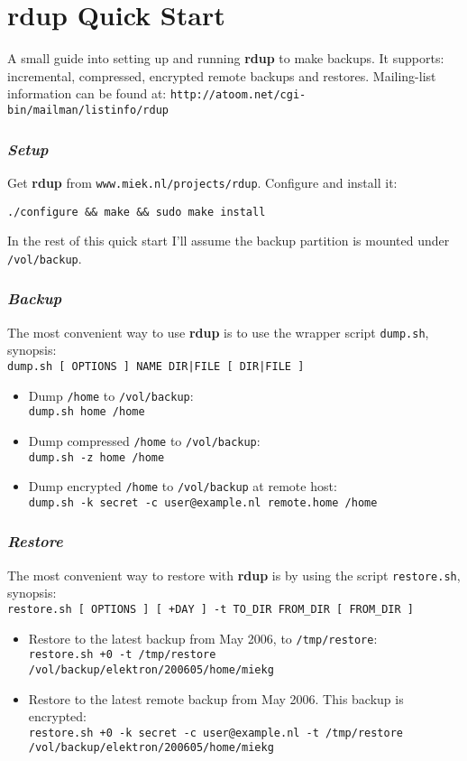 \documentclass[a4paper, openany]{memoir}
\newcommand{\rdup}{\textbf{rdup}}
\newcommand{\cmd}[1]{\texttt{#1}}
\newcommand{\url}[1]{\texttt{#1}}
\newcommand{\path}[1]{\texttt{#1}}
\begin{document}
\chapter*{\rdup{} Quick Start}
A small guide into setting up and running \rdup{} to make backups. It
supports: incremental, compressed, encrypted remote backups and
restores. Mailing-list information can be found at:
\path{http://atoom.net/cgi-bin/mailman/listinfo/rdup}

\subsection*{\textit{Setup}}
Get \rdup{} from \url{www.miek.nl/projects/rdup}. Configure and install
it:
\begin{verbatim}
./configure && make && sudo make install
\end{verbatim}
In the rest of this quick start I'll assume the backup partition
is mounted under \path{/vol/backup}.

\subsection*{\textit{Backup}}
The most convenient way to use \rdup{} is to use the wrapper
script \cmd{dump.sh}, synopsis:\\
\cmd{dump.sh [ OPTIONS ] NAME DIR|FILE [ DIR|FILE ]}
\begin{itemize}
\item
Dump \path{/home} to \path{/vol/backup}:\\
\cmd{dump.sh home /home} 
\item
Dump compressed \path{/home} to \path{/vol/backup}:\\
\cmd{dump.sh -z home /home} 
\item
Dump encrypted \path{/home} to \path{/vol/backup} at remote
host:\\
\cmd{dump.sh -k secret -c user@example.nl remote.home /home}
\end{itemize}

\subsection*{\textit{Restore}}
The most convenient way to restore with \rdup{} is by using
the script \cmd{restore.sh}, synopsis:\\
\cmd{restore.sh [ OPTIONS ] [ +DAY ] -t TO\_DIR FROM\_DIR [ FROM\_DIR ]}
\begin{itemize}
\item
Restore to the latest backup from May 2006, to \path{/tmp/restore}:\\
\cmd{restore.sh +0 -t /tmp/restore \\
/vol/backup/elektron/200605/home/miekg}
\item
Restore to the latest remote backup from May 2006. This backup
is encrypted:\\
\cmd{restore.sh +0 -k secret -c user@example.nl -t /tmp/restore \\
/vol/backup/elektron/200605/home/miekg}
\end{itemize}
\end{document}
